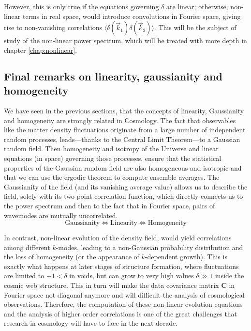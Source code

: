 However, this is only true if the equations governing $\delta$ are linear; otherwise, non-linear terms in real space,
would introduce convolutions in Fourier space, giving rise to non-vanishing correlations $\langle \delta (\vec{k}_1)  \delta (\vec{k}_2) \rangle$. This will be the subject of study of the non-linear power spectrum, which will be treated with more depth in chapter \ref{chap:nonlinear}.

\subsection{Final remarks on linearity, gaussianity and homogeneity}

We have seen in the previous sections, that the concepts of linearity, Gaussianity and homogeneity
are strongly related in Cosmology.
The fact that observables like the matter density fluctuations originate from a large number 
of independent random processes, leads---thanks to the Central Limit Theorem---to a Gaussian random field.
Then homogeneity and isotropy of the Universe and linear equations (in space) governing those processes, ensure that the statistical properties of the Gaussian random field
are also homogeneous and isotropic and that we can use the ergodic theorem to compute ensemble averages.
The Gaussianity of the field (and its vanishing average value) allows us to describe the field, solely with its two
point correlation function, which directly connects us to the power spectrum and then to the fact that in Fourier space, 
pairs of wavemodes are mutually uncorrelated.
\begin{equation}
\textrm{Gaussianity}\Leftrightarrow\textrm{Linearity}\Leftrightarrow\textrm{Homogeneity}
\end{equation}

In contrast, non-linear evolution of the density field, would yield correlations among different $k$-modes, 
leading to a non-Gaussian probability distribution and the loss of homogeneity (or the appearance of $k$-dependent growth).
This is exactly what happens at later stages of structure formation, 
where fluctuations are limited to $-1 < \delta$ in voids, 
but can grow to very high values $\delta \gg 1$ inside the cosmic web structure.
This in turn will make the data covariance matrix $\mathbf{C}$ in Fourier space not diagonal anymore and 
will difficult the analysis of cosmological observations.
Therefore, the computation
of these non-linear evolution equations 
and the analysis of higher order correlations is one of the great challenges that research in cosmology 
will have to face in the next decade.

